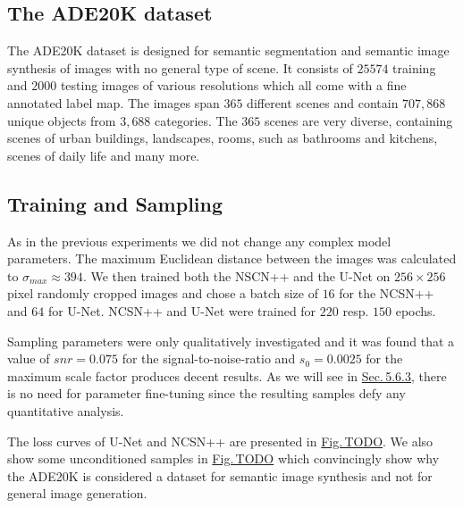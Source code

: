 \subsection{The ADE20K dataset}
The ADE20K dataset \cite{ade20k}  is designed for semantic segmentation and semantic image synthesis of images with no general type of scene. It consists of $25574$ training and $2000$ testing images of various resolutions which all come with a fine annotated label map. The images span $365$ different scenes and contain $707{,}868$ unique objects from $3{,}688$ categories. The $365$ scenes are very diverse, containing scenes of urban buildings, landscapes, rooms, such as bathrooms and kitchens, scenes of daily life and many more. 
\subsection{Training and Sampling}
As in the previous experiments we did not change any complex model parameters. The maximum Euclidean distance between the images was calculated to $\sigma_{max}\approx394$. We then trained both the NSCN++ and the U-Net on $256\times256$ pixel randomly cropped images and chose a batch size of $16$ for the NCSN++ and $64$ for U-Net. NCSN++ and U-Net were trained for $220$ resp. $150$ epochs.

Sampling parameters were only qualitatively investigated and it was found that a value of $snr=0.075$ for the signal-to-noise-ratio and $s_0=0.0025$ for the maximum scale factor produces decent results. As we will see in \hyperref[sec:5.6.3]{Sec.\,5.6.3}, there is no need for parameter fine-tuning since the resulting samples defy any quantitative analysis.

The loss curves of U-Net and NCSN++ are presented in \hyperref[fig:]{Fig.\,TODO}. We also show some unconditioned samples in \hyperref[fig:]{Fig.\,TODO} which convincingly show why the ADE20K is considered a dataset for semantic image synthesis and not for general image generation.

